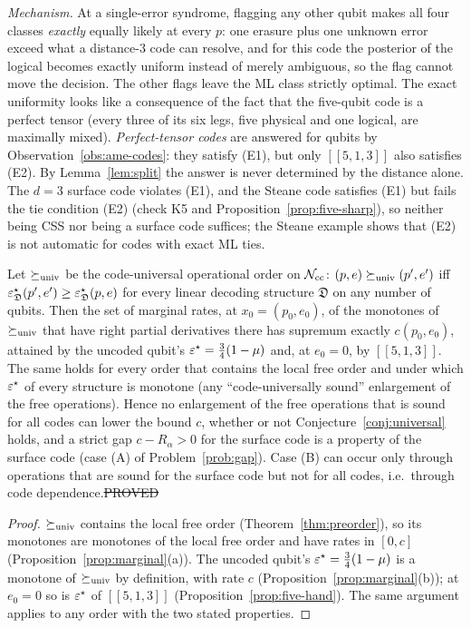 \noindent\emph{Mechanism.} At a single-error syndrome, flagging any other qubit makes all four classes \emph{exactly} equally likely at every $p$: one erasure plus one unknown error exceed what a distance-$3$ code can resolve, and for this code the posterior of the logical becomes exactly uniform instead of merely ambiguous, so the flag cannot move the decision. The other flags leave the ML class strictly optimal. The exact uniformity looks like a consequence of the fact that the five-qubit code is a perfect tensor (every three of its six legs, five physical and one logical, are maximally mixed). \emph{Perfect-tensor codes} are answered for qubits by Observation~\ref{obs:ame-codes}: they satisfy (E1), but only $[[5,1,3]]$ also satisfies (E2). By Lemma~\ref{lem:split} the answer is never determined by the distance alone. The $d=3$ surface code violates (E1), and the Steane code satisfies (E1) but fails the tie condition (E2) (check K5 and Proposition~\ref{prop:five-sharp}), so neither being CSS nor being a surface code suffices; the Steane example shows that (E2) is not automatic for codes with exact ML ties.

\begin{proposition}\label{prop:gap-A}
Let $\succeq_{\rm univ}$ be the code-universal operational order on $\mathcal{N}_{\rm cc}$: $(p,e)\succeq_{\rm univ}(p',e')$ iff $\varepsilon^{\star}_{\mathfrak D}(p',e')\ge\varepsilon^{\star}_{\mathfrak D}(p,e)$ for every linear decoding structure $\mathfrak D$ on any number of qubits. Then the set of marginal rates, at $x_0=(p_0,e_0)$, of the monotones of $\succeq_{\rm univ}$ that have right partial derivatives there has supremum exactly $c(p_0,e_0)$, attained by the uncoded qubit's $\varepsilon^{\star}=\tfrac34(1-\mu)$ and, at $e_0=0$, by $[[5,1,3]]$. The same holds for every order that contains the local free order and under which $\varepsilon^{\star}$ of every structure is monotone (any ``code-universally sound'' enlargement of the free operations).
Hence no enlargement of the free operations that is sound for all codes can lower the bound $c$, whether or not Conjecture~\ref{conj:universal} holds, and a strict gap $c-R_\alpha>0$ for the surface code is a property of the surface code (case (A) of Problem~\ref{prob:gap}). Case (B) can occur only through operations that are sound for the surface code but not for all codes, i.e.\ through code dependence.\hfill\st{PROVED}
\end{proposition}
\begin{proof}
$\succeq_{\rm univ}$ contains the local free order (Theorem~\ref{thm:preorder}), so its monotones are monotones of the local free order and have rates in $[0,c]$ (Proposition~\ref{prop:marginal}(a)). The uncoded qubit's $\varepsilon^{\star}=\tfrac34(1-\mu)$ is a monotone of $\succeq_{\rm univ}$ by definition, with rate $c$ (Proposition~\ref{prop:marginal}(b)); at $e_0=0$ so is $\varepsilon^{\star}$ of $[[5,1,3]]$ (Proposition~\ref{prop:five-hand}). The same argument applies to any order with the two stated properties.
\end{proof}

